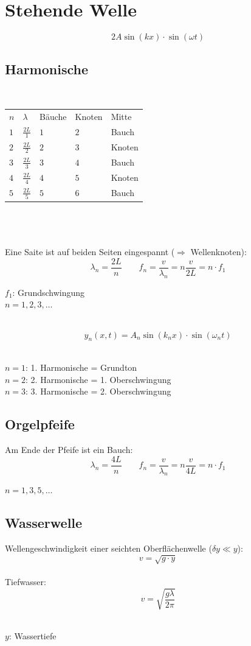 \section{Stehende Welle}
\[\boxed{
	2A\sin(kx) \cdot \sin(\omega t)
}\]


\subsection{Harmonische}
\hfill\\
\begin{tabular}{|lllll|}
	\hline
	\rowcolor{white} $n$ & $\lambda$ & Bäuche & Knoten & Mitte \\
	\rowcolor{lgray} $1$ & $\frac{2 L}{1}$ & $1$ & $2$ & Bauch \\
	\rowcolor{white} $2$ & $\frac{2 L}{2}$ & $2$ & $3$ & Knoten \\
	\rowcolor{lgray} $3$ & $\frac{2 L}{3}$ & $3$ & $4$ & Bauch \\
	\rowcolor{white} $4$ & $\frac{2 L}{4}$ & $4$ & $5$ & Knoten \\
	\rowcolor{lgray} $5$ & $\frac{2 L}{5}$ & $5$ & $6$ & Bauch \\
	\hline
\end{tabular}
\\\\\\
Eine Saite ist auf beiden Seiten eingespannt ($\Rightarrow$ Wellenknoten):
\[
	\lambda_n = \frac{2L}{n} \qquad
	f_n = \frac{v}{\lambda_n} = n \frac{v}{2L} = n \cdot f_1
\]
\begin{footnotesize}
	$f_1$: Grundschwingung\\
	$n=1,2,3,\ldots$
\end{footnotesize}
\\
\[\boxed{
	y_n(x,t)=A_n \sin(k_nx) \cdot \sin(\omega_nt)
}\]
\\
\begin{footnotesize}
	$n=1$: 1. Harmonische = Grundton\\
	$n=2$: 2. Harmonische = 1. Oberschwingung\\
	$n=3$: 3. Harmonische = 2. Oberschwingung\\
\end{footnotesize}

\subsection{Orgelpfeife}
Am Ende der Pfeife ist ein Bauch:
\[
	\lambda_n = \frac{4L}{n} \qquad f_n = \frac{v}{\lambda_n} = n\frac{v}{4L} = n \cdot f_1
\]
\begin{footnotesize}
	$n=1,3,5,\ldots$
\end{footnotesize}


\subsection{Wasserwelle}
Wellengeschwindigkeit einer seichten Oberflächenwelle ($\delta y \ll y$):
\[\boxed{
	v = \sqrt{g \cdot y}
}\]
\\
Tiefwasser:
\[\boxed{
	v = \sqrt{\frac{g \lambda}{2 \pi}}
}\]
\\
\begin{footnotesize}
	$y$: Wassertiefe
\end{footnotesize}
